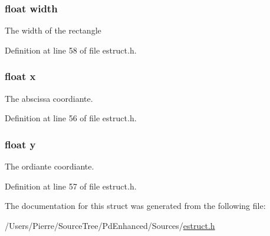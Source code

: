 \hypertarget{struct__rect_ae426f00e82704fa09578f5446e22d915}{
\subsubsection[{width}]{\setlength{\rightskip}{0pt plus 5cm}float width}}\label{struct__rect_ae426f00e82704fa09578f5446e22d915}
The width of the rectangle 

Definition at line 58 of file estruct.\-h.

\hypertarget{struct__rect_ad0da36b2558901e21e7a30f6c227a45e}{
\subsubsection[{x}]{\setlength{\rightskip}{0pt plus 5cm}float x}}\label{struct__rect_ad0da36b2558901e21e7a30f6c227a45e}
The abscissa coordiante. 

Definition at line 56 of file estruct.\-h.

\hypertarget{struct__rect_aa4f0d3eebc3c443f9be81bf48561a217}{
\subsubsection[{y}]{\setlength{\rightskip}{0pt plus 5cm}float y}}\label{struct__rect_aa4f0d3eebc3c443f9be81bf48561a217}
The ordiante coordiante. 

Definition at line 57 of file estruct.\-h.



The documentation for this struct was generated from the following file\-:\begin{DoxyCompactItemize}
\item 
/\-Users/\-Pierre/\-Source\-Tree/\-Pd\-Enhanced/\-Sources/\hyperlink{estruct_8h}{estruct.\-h}\end{DoxyCompactItemize}

